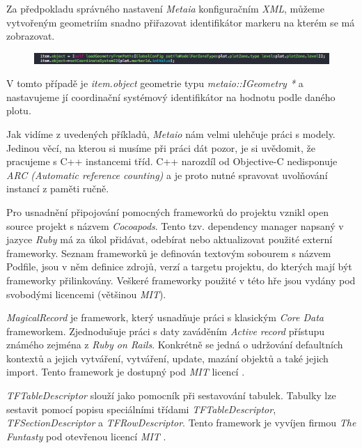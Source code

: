 \documentclass[twoside,12pt]{article}
\begin{document}
Za předpokladu správného nastavení \textit{Metaia} konfiguračním \textit{XML}, můžeme vytvořeným geometriím snadno přiřazovat identifikátor markeru na kterém se má zobrazovat.

\begin{figure}[H]
\centering
    \includegraphics[width=430px, center]{images/code_coordinate.png}
\captionsetup{justification=centering}
    \label{navigation_bar}
\end{figure}

V tomto případě je \textit{item.object} geometrie typu \textit{metaio::IGeometry *} a nastavujeme jí coordinační systémový identifikátor na hodnotu podle daného plotu. 

Jak vidíme z uvedených příkladů, \textit{Metaio} nám velmi ulehčuje práci s modely. Jedinou věcí, na kterou si musíme při práci dát pozor, je si uvědomit, že pracujeme s C++ instancemi tříd. C++ narozdíl od Objective-C nedisponuje \textit{ARC (Automatic reference counting)} a je proto nutné spravovat uvolňování instancí z paměti ručně.

Pro usnadnění připojování pomocných frameworků do projektu vznikl open source projekt s názvem \textit{Cocoapods}. Tento tzv. dependency manager napsaný v jazyce \textit{Ruby} má za úkol přidávat, odebírat nebo aktualizovat použité externí frameworky. Seznam frameworků je definován textovým sobourem s názvem Podfile, jsou v něm definice zdrojů, verzí a targetu projektu, do kterých mají být frameworky přilinkovány. Veškeré frameworky použité v této hře jsou vydány pod svobodými licencemi (většinou \textit{MIT}).

\textit{MagicalRecord} je framework, který usnadňuje práci s klasickým \textit{Core Data} frameworkem. Zjednodušuje práci s daty zaváděním \textit{Active record} přístupu známého zejména z \textit{Ruby on Rails}. Konkrétně se jedná o udržování defaultních kontextů a jejich vytváření, vytváření, update, mazání objektů a také jejich import. Tento framework je dostupný pod \textit{MIT} licencí \cite{magical_record}.

\textit{TFTableDescriptor} slouží jako pomocník při sestavování tabulek. Tabulky lze sestavit pomocí popisu  speciálními třídami \textit{TFTableDescriptor}, \textit{TFSectionDescriptor} a \textit{TFRowDescriptor}. Tento framework je vyvíjen firmou \textit{The Funtasty} pod otevřenou licencí \textit{MIT} \cite{tftabledescriptor}.
\end{document}
